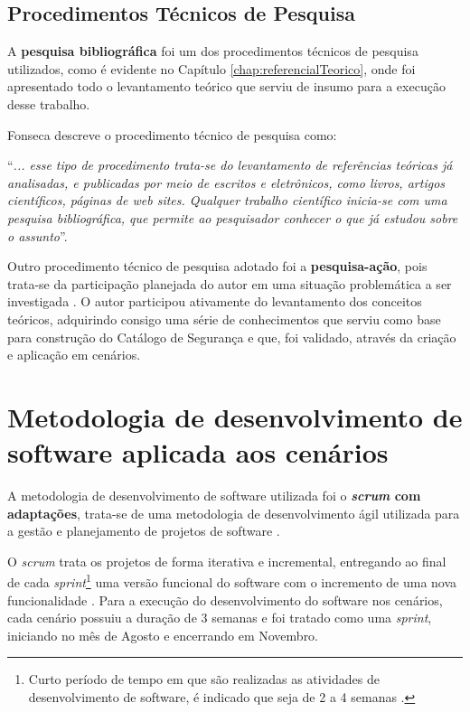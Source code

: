 \subsection{Procedimentos Técnicos de Pesquisa}
\label{sub:procedimentosDePesquisa}

A \textbf{pesquisa bibliográfica} foi um dos procedimentos técnicos de pesquisa utilizados, como é evidente no Capítulo \ref{chap:referencialTeorico}, onde foi apresentado todo o levantamento teórico que serviu de insumo para a execução desse trabalho. 

Fonseca descreve o procedimento técnico de pesquisa como:

\begin{citacao}
	“\textit{... esse tipo de procedimento trata-se do levantamento de referências teóricas já analisadas, e publicadas por meio de escritos e eletrônicos, como livros, artigos científicos, páginas de web sites. Qualquer trabalho científico inicia-se com uma pesquisa bibliográfica, que permite ao pesquisador conhecer o que já estudou sobre o assunto}”.
	\cite[p.35]{fonseca2002metodologia}
\end{citacao}
 
 
Outro procedimento técnico de pesquisa adotado foi a \textbf{pesquisa-ação}, pois trata-se da participação planejada do autor em uma situação problemática a ser investigada \cite{fonseca2002metodologia}. O autor participou ativamente do levantamento dos conceitos teóricos, adquirindo consigo uma série de conhecimentos que serviu como base para construção do Catálogo de Segurança e que, foi validado, através da criação e aplicação em cenários. 
 

\section{Metodologia de desenvolvimento de software aplicada aos cenários}
\label{sec:metodologiaDeDesenvolvimentoDeSoftware}


A metodologia de desenvolvimento de software utilizada foi o  \textbf{\textit{scrum} com adaptações}, trata-se de uma metodologia de desenvolvimento ágil utilizada para a gestão e planejamento de projetos de software \cite{schwaber2002agile}. 

O \textit{scrum} trata os projetos de forma iterativa e incremental, entregando ao final de cada \textit{sprint}\footnote[1]{Curto período de tempo em que são realizadas as atividades de desenvolvimento de software, é indicado que seja de 2 a 4 semanas \cite{schwaber2002agile}.} uma versão funcional do software com o incremento de uma nova funcionalidade \cite{schwaber2002agile}. Para a execução do desenvolvimento do software nos cenários, cada cenário possuiu a duração de 3 semanas e foi tratado como uma \textit{sprint}, iniciando no mês de Agosto e encerrando em Novembro.  
 
